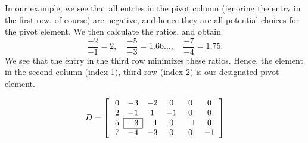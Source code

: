 In our example, we see that all entries in the pivot column (ignoring the entry in the first row, of course) are negative, and hence they are all potential choices for the pivot element.
We then calculate the ratios, and obtain
\[
\frac{-2}{-1} = 2,\quad \frac{-5}{-3} = 1.66...,\quad \frac{-7}{-4} = 1.75.
\]
We see that the entry in the third row minimizes these ratios.
Hence, the element in the second column (index 1), third row (index 2) is our designated
pivot element.

\[ D = \left[ \:
\begin{array}{*{7}{c}}

0 & -3 & -2 & 0 & 0 & 0\\
2 & -1 & 1 & -1 & 0 & 0\\\cline{2-2}
5 & \multicolumn{1}{|c}{-3} & \multicolumn{1}{|c}{-1} & 0 & -1 & 0\\\cline{2-2}
7 & -4 & -3 & 0 & 0 & -1\\
\end{array}
\right] \]

